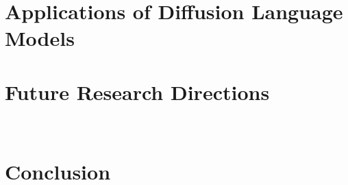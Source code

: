 \documentclass[lettersize,journal]{IEEEtran}
\begin{document}
\section{Applications of Diffusion Language Models}
\label{sec:applications}





\section{Future Research Directions}
\label{sec:future}



~\section{Conclusion}
\label{sec:conclusion}







\newpage
 







\vfill
\end{document}
